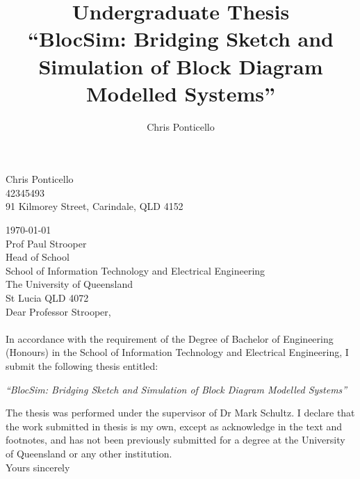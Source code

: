 \documentclass[titlesmallcaps, examinerscopy, copyrightpage]{uqthesis}
\begin{document}

\title{Undergraduate Thesis\\ ``BlocSim: Bridging Sketch and Simulation of Block Diagram Modelled Systems'' }
\author{Chris Ponticello}

\renewcommand{\degreetext}{in partial fulfilment of the Degree Bachelor of Engineering\\ in the
discipline of Computer Systems Engineering}

\frontmatter

\titlepage

\begin{flushright}
Chris Ponticello\\ 42345493\\ 91 Kilmorey Street, Carindale, QLD 4152\\
\end{flushright}

\noindent \today \\

\noindent Prof Paul Strooper\\
Head of School\\
School of Information Technology and Electrical Engineering\\
The University of  Queensland\\
St Lucia QLD 4072\\

\noindent Dear Professor Strooper,\\ \\
In accordance with the requirement of the Degree of Bachelor of Engineering (Honours) in the School
of Information Technology and Electrical Engineering, I submit the following thesis entitled:

\begin{center}
  \emph{``BlocSim: Bridging Sketch and Simulation of Block Diagram Modelled Systems''}
\end{center}

\noindent The thesis was performed under the supervisor of Dr Mark Schultz. I declare that the work
submitted in thesis is my own, except as acknowledge in the text and footnotes, and has not been
previously submitted for a degree at the University of Queensland or any other institution. \\

\noindent Yours sincerely \\ \\ 
\end{document}
